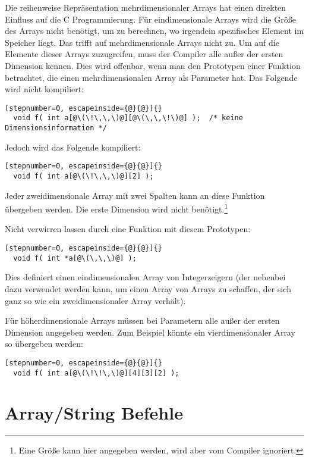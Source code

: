 Die reihenweise Repr\"{a}sentation mehrdimensionaler Arrays hat einen
direkten Einfluss auf die C Programmierung. F\"{u}r eindimensionale
Arrays wird die Gr\"{o}{\ss}e des Arrays nicht ben\"{o}tigt, um zu berechnen, wo
irgendein spezifisches Element im Speicher liegt. Das trifft auf
mehrdimensionale Arrays nicht zu. Um auf die Elemente dieser Arrays
zuzugreifen, muss der Compiler alle au{\ss}er der ersten Dimension
kennen. Dies wird offenbar, wenn man den Prototypen einer Funktion
betrachtet, die einen mehrdimensionalen Array als Parameter hat. Das
Folgende wird nicht kompiliert:
\begin{lstlisting}[stepnumber=0, escapeinside={@}{@}]{}
  void f( int a[@\(\!\,\,\)@][@\(\,\,\!\)@] );  /* keine Dimensionsinformation */
\end{lstlisting}
Jedoch wird das Folgende kompiliert:
\begin{lstlisting}[stepnumber=0, escapeinside={@}{@}]{}
  void f( int a[@\(\!\,\,\)@][2] );
\end{lstlisting}

Jeder zweidimensionale Array mit zwei Spalten kann an diese Funktion
\"{u}bergeben werden. Die erste Dimension wird nicht
ben\"{o}tigt.\footnote{Eine Gr\"{o}{\ss}e kann hier angegeben werden, wird aber
vom Compiler ignoriert.}

Nicht verwirren lassen durch eine Funktion mit diesem Prototypen:
\begin{lstlisting}[stepnumber=0, escapeinside={@}{@}]{}
  void f( int *a[@\(\,\,\)@] );
\end{lstlisting}
Dies definiert einen eindimensionalen Array von Integerzeigern (der
nebenbei dazu verwendet werden kann, um einen Array von Arrays zu
schaffen, der sich ganz so wie ein zweidimensionaler Array verh\"{a}lt).

F\"{u}r h\"{o}herdimensionale Arrays m\"{u}ssen bei Parametern alle au{\ss}er der
ersten Dimension angegeben werden. Zum Beispiel k\"{o}nnte ein
vierdimensionaler Array so \"{u}bergeben werden:
\begin{lstlisting}[stepnumber=0, escapeinside={@}{@}]{}
  void f( int a[@\(\!\!\,\)@][4][3][2] );
\end{lstlisting}

\section{Array/String Befehle}


